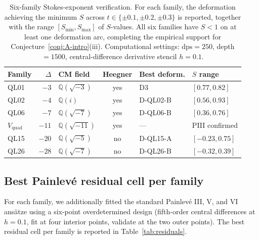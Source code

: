\documentclass[11pt,reqno]{amsart}
\theoremstyle{definition}
\begin{document}
\begin{table}[h]
\centering
\begin{tabular}{lrlcll}
\toprule
Family            & $\Delta$ & CM field            & Heegner & Best deform. & $S$ range \\
\midrule
QL01              & $-3$  & $\mathbb{Q}(\sqrt{-3})$  & yes & D3 & $[0.77,0.82]$ \\
QL02              & $-4$  & $\mathbb{Q}(i)$          & yes & D-QL02-B & $[0.56,0.93]$ \\
QL06              & $-7$  & $\mathbb{Q}(\sqrt{-7})$  & yes & D-QL06-B & $[0.36,0.76]$ \\
$V_{\mathrm{quad}}$ & $-11$ & $\mathbb{Q}(\sqrt{-11})$ & yes & ---     & PIII confirmed \\
QL15              & $-20$ & $\mathbb{Q}(\sqrt{-5})$  & no  & D-QL15-A & $[-0.23,0.75]$ \\
QL26              & $-28$ & $\mathbb{Q}(\sqrt{-7})$  & no  & D-QL26-B & $[-0.32,0.39]$ \\
\bottomrule
\end{tabular}
\caption{Six-family Stokes-exponent verification. For each
family, the deformation achieving the minimum $S$ across
$t\in\{\pm 0.1,\pm 0.2,\pm 0.3\}$ is reported, together with
the range $[S_{\min},S_{\max}]$ of $S$-values. All six
families have $S<1$ on at least one
deformation arc, completing the empirical support for
Conjecture~\ref{conj:A-intro}(iii). Computational settings:
$\mathrm{dps}=250$, depth $=1500$, central-difference
derivative stencil $h=0.1$.}
\label{tab:6family}
\end{table}

\subsection{Best Painlev\'e residual cell per family}

For each family, we additionally fitted the standard
Painlev\'e III, V, and VI ans\"atze using a
six-point overdetermined design (fifth-order central
differences at $h=0.1$, fit at four interior points,
validate at the two outer points). The best residual cell
per family is reported in Table~\ref{tab:residuals}.
\end{document}
